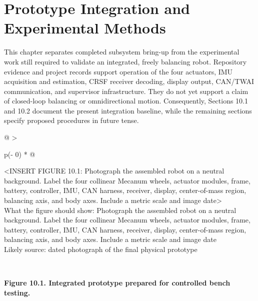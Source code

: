 \chapter{Prototype Integration and Experimental Methods}\label{ch:prototype-integration-and-experimental-methods}

This chapter separates completed subsystem bring-up from the
experimental work still required to validate an integrated, freely
balancing robot. Repository evidence and project records support
operation of the four actuators, IMU acquisition and estimation, CRSF
receiver decoding, display output, CAN\slash{}TWAI communication, and
supervisor infrastructure. They do not yet support a claim of
closed-loop balancing or omnidirectional motion. Consequently, Sections
10.1 and 10.2 document the present integration baseline, while the
remaining sections specify proposed procedures in future tense.

\begin{longtable}[]{@{}
  >{\raggedright\arraybackslash}p{(\columnwidth - 0\tabcolsep) * }@{}}
\toprule\noalign{}
\begin{minipage}[b]{\linewidth}\raggedright
\textless INSERT FIGURE 10.1: Photograph the assembled robot on a
neutral background. Label the four collinear Mecanum wheels, actuator
modules, frame, battery, controller, IMU, CAN harness, receiver,
display, center-of-mass region, balancing axis, and body axes. Include a
metric scale and image date\textgreater{}\\
What the figure should show: Photograph the assembled robot on a neutral
background. Label the four collinear Mecanum wheels, actuator modules,
frame, battery, controller, IMU, CAN harness, receiver, display,
center-of-mass region, balancing axis, and body axes. Include a metric
scale and image date\\
Likely source: dated photograph of the final physical prototype\strut
\end{minipage} \\
\midrule\noalign{}
\endhead
\bottomrule\noalign{}
\endlastfoot
\end{longtable}

\begin{center}\singlespacing
{}
\textbf{Figure 10.1. Integrated prototype prepared for controlled bench testing.}
\end{center}

